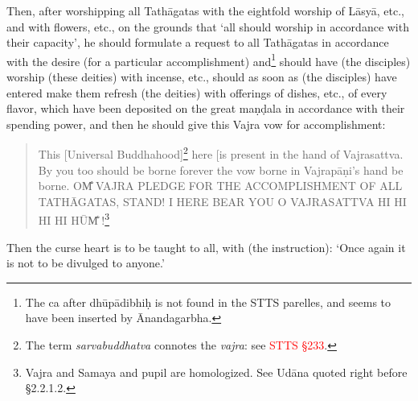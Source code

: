 \documentclass[11pt]{book}
\makeatletter
\def\fakesc#1{%
  \begingroup%
  \xdef\fake@name{\csname\curr@fontshape/\f@size\endcsname}%
  \fontsize{1.3\fontdimen8\fake@name}{\baselineskip}\selectfont%
  \uppercase{#1}%
  \endgroup%
}
\newcommand{\mantra}[1]{\fakesc{#1}}
\newcommand{\red}[1]{\textcolor{red}{#1}}
\newcommand{\skt}[1]{\emph{#1}}
\makeatother
\begin{document}
Then, after worshipping all Tathāgatas with the eightfold worship of Lāsyā, etc., and with flowers, etc., on the grounds that `all should worship in accordance with their capacity', he should formulate a request to all Tathāgatas in accordance with the desire (for a particular accomplishment) and\footnote{The ca after dhūpādibhiḥ is not found in the STTS parelles, and seems to have been inserted by Ānandagarbha.} should have (the disciples) worship (these deities) with incense, etc., should as soon as (the disciples) have entered make them refresh (the deities) with offerings of dishes, etc., of every flavor, which have been deposited on the great maṇḍala in accordance with their spending power, and then he should give this Vajra vow for accomplishment:

\begin{quote}
This [Universal Buddhahood]\footnote{The term \skt{sarvabuddhatva} connotes the \skt{vajra}: see \red{STTS §233}.} here [is present in the hand of Vajrasattva. By you too should be borne forever the vow borne in Vajrapāṇi's hand be borne. \mantra{om̐ vajra pledge for the accomplishment of all tathāgatas, stand! I here bear you o vajrasattva hi hi hi hi hūm̐}!\footnote{Vajra and Samaya and pupil are homologized. See Udāna quoted right before §2.2.1.2.}
\end{quote}

Then the curse heart is to be taught to all, with (the instruction): `Once again it is not to be divulged to anyone.'
\end{document}
